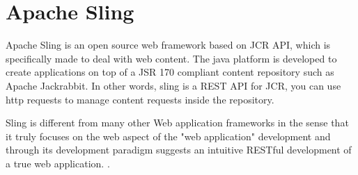 \section{Apache Sling} 
Apache Sling is an open source web framework based on JCR
API, which is specifically made to deal with web content. The java platform is
developed to create applications on top of a JSR 170 compliant content
repository such as Apache Jackrabbit. In other words, sling is a REST API for
JCR, you can use http requests to manage content requests inside the repository.
\cite {hid-sp18-401_stackoverflow_Sling}

Sling is different from many other Web application frameworks in the sense that
it truly focuses on the web aspect of the "web application" development and
through its development paradigm suggests an intuitive RESTful development of a
true web application. \cite{hid-sp18-401_wiki_Sling}.

